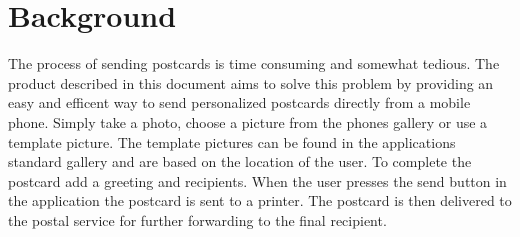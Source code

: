 \documentclass[10pt,a4paper]{article}
\begin{document}
\section{Background}
The process of sending postcards is time consuming and somewhat tedious. The product described in this document aims to solve this problem by providing an easy and efficent way to send personalized postcards directly from a mobile phone. Simply take a photo, choose a picture from the phones gallery or use a template picture. The template pictures can be found in the applications standard gallery and are based on the location of the user. To complete the postcard add a greeting and recipients. When the user presses the send button in the application the postcard is sent to a printer. The postcard is then delivered to the postal service for further forwarding to the final recipient. 

%
%

\end{document}
